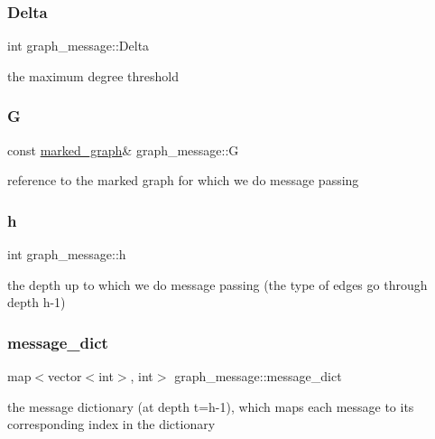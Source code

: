 \subsubsection{\texorpdfstring{Delta}{Delta}}
{\footnotesize\ttfamily int graph\+\_\+message\+::\+Delta}



the maximum degree threshold 

\mbox{\label{classgraph__message_abffce6d6a7868da0e747425569759f0f}} 
\subsubsection{\texorpdfstring{G}{G}}
{\footnotesize\ttfamily const \hyperlink{classmarked__graph}{marked\+\_\+graph}\& graph\+\_\+message\+::G}



reference to the marked graph for which we do message passing 

\mbox{\label{classgraph__message_a934d63ed7275c211e13c6fb68824ed46}} 
\subsubsection{\texorpdfstring{h}{h}}
{\footnotesize\ttfamily int graph\+\_\+message\+::h}



the depth up to which we do message passing (the type of edges go through depth h-\/1) 

\mbox{\label{classgraph__message_a7890d2dff06b9de6f98734c69d8fbcfd}} 
\subsubsection{\texorpdfstring{message\+\_\+dict}{message\_dict}}
{\footnotesize\ttfamily map$<$vector$<$int$>$, int$>$ graph\+\_\+message\+::message\+\_\+dict}



the message dictionary (at depth t=h-\/1), which maps each message to its corresponding index in the dictionary 

